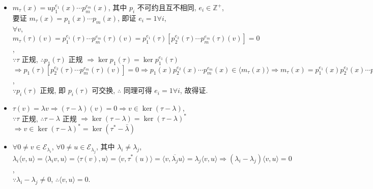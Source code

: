 \documentclass{note}
\begin{document}
\begin{pf}
\begin{itemize}
        $\Longrightarrow 0=\langle v,0\rangle=\langle v,\sigma(v)\rangle=\langle v,\tau^*(\tau(v))\rangle=\langle\tau(v),\tau(v)\rangle=\norm{\tau(v)}^2\Longrightarrow\tau(v)=0\Longrightarrow v\in\ker\tau\Longrightarrow\ker\tau^k\subseteq\ker\tau$.\\
        综上, 得证.
        \item[(4)] $m_{\tau}(x)=up_1^{e_1}(x)\cdots p_m^{e_m}(x)$, 其中 $p_i$ 不可约且互不相同, $e_i\in\mathbb{Z}^+$,\\
        要证 $m_{\tau}(x)=p_1(x)\cdots p_m(x)$, 即证 $e_i=1\forall i$,\\
        $\forall v$, $m_{\tau}(\tau)(v)=p_1^{e_1}(\tau)\cdots p_m^{e_m}(\tau)(v)=p_1^{e_1}(\tau)[p_2^{e_2}(\tau)\cdots p_m^{e_m}(\tau)(v)]=0$,\\
        $\because\tau$ 正规, $\therefore p_1(\tau)$ 正规 $\Longrightarrow\ker p_1(\tau)=\ker p_1^{e_1}(\tau)$\\
        $\Longrightarrow p_1(\tau)[p_2^{e_2}(\tau)\cdots p_m^{e_m}(\tau)(v)]=0\Longrightarrow p_1(x)p_2^{e_2}(x)\cdots p_m^{e_m}(x)\in\langle m_{\tau}(x)\rangle\Longrightarrow m_{\tau}(x)=p_1^{e_1}(x)p_2^{e_2}(x)\cdots p_m^{e_m}(x)\mid p_1^1(x)p_2^{e_2}(x)\cdots p_m^{e_m}(x)\Longrightarrow e_1=1$,\\
        $\because p_i(\tau)$ 正规, 即 $p_i(\tau)$ 可交换, $\therefore$ 同理可得 $e_i=1\forall i$, 故得证.
        \item[(5)] $\tau(v)=\lambda v\Longrightarrow(\tau-\lambda)(v)=0\Longrightarrow v\in\ker(\tau-\lambda)$,\\
        $\because\tau$ 正规, $\therefore\tau-\lambda$ 正规 $\Longrightarrow\ker(\tau-\lambda)=\ker(\tau-\lambda)^*$\\
        $\Longrightarrow v\in\ker(\tau-\lambda)^*=\ker(\tau^*-\bar{\lambda})$
        \item[(6)] $\forall 0\neq v\in\mathcal{E}_{\lambda_i}$, $\forall 0\neq u\in\mathcal{E}_{\lambda_j}$, 其中 $\lambda_i\neq\lambda_j$,\\
        $\lambda_i\langle v,u\rangle=\langle\lambda_iv,u\rangle=\langle\tau(v),u\rangle=\langle v,\tau^*(u)\rangle=\langle v,\overline{\lambda_j}u\rangle=\lambda_j\langle v,u\rangle\Longrightarrow(\lambda_i-\lambda_j)\langle v,u\rangle=0$,\\
        $\because\lambda_i-\lambda_j\neq 0$, $\therefore\langle v,u\rangle=0$.
    \end{itemize}
\end{pf}
\end{document}
